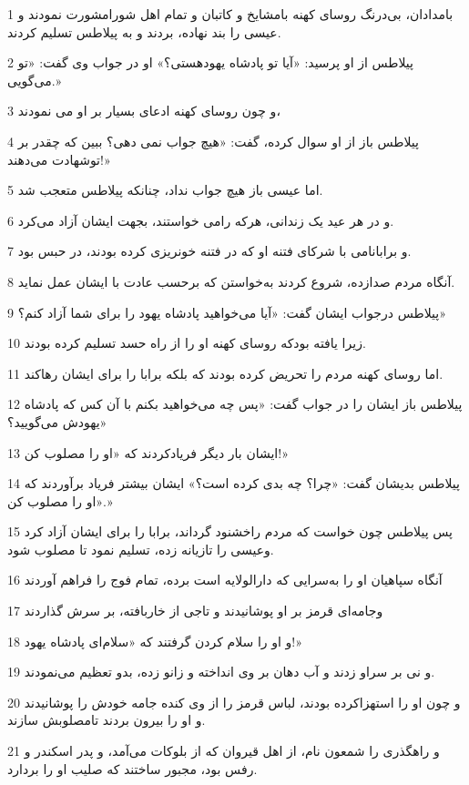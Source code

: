 \par 1 بامدادان، بی‌درنگ روسای کهنه بامشایخ و کاتبان و تمام اهل شورامشورت نمودند و عیسی را بند نهاده، بردند و به پیلاطس تسلیم کردند.
\par 2 پیلاطس از او پرسید: «آیا تو پادشاه یهودهستی؟» او در جواب وی گفت: «تو می‌گویی.»
\par 3 و چون روسای کهنه ادعای بسیار بر او می نمودند،
\par 4 پیلاطس باز از او سوال کرده، گفت: «هیچ جواب نمی دهی؟ ببین که چقدر بر توشهادت می‌دهند!»
\par 5 اما عیسی باز هیچ جواب نداد، چنانکه پیلاطس متعجب شد.
\par 6 و در هر عید یک زندانی، هر‌که رامی خواستند، بجهت ایشان آزاد می‌کرد.
\par 7 و برابانامی با شرکای فتنه او که در فتنه خونریزی کرده بودند، در حبس بود.
\par 8 آنگاه مردم صدازده، شروع کردند به‌خواستن که برحسب عادت با ایشان عمل نماید.
\par 9 پیلاطس درجواب ایشان گفت: «آیا می‌خواهید پادشاه یهود را برای شما آزاد کنم؟»
\par 10 زیرا یافته بودکه روسای کهنه او را از راه حسد تسلیم کرده بودند.
\par 11 اما روسای کهنه مردم را تحریض کرده بودند که بلکه برابا را برای ایشان رهاکند.
\par 12 پیلاطس باز ایشان را در جواب گفت: «پس چه می‌خواهید بکنم با آن کس که پادشاه یهودش می‌گویید؟»
\par 13 ایشان بار دیگر فریادکردند که «او را مصلوب کن!»
\par 14 پیلاطس بدیشان گفت: «چرا؟ چه بدی کرده است؟» ایشان بیشتر فریاد برآوردند که «او را مصلوب کن.»
\par 15 پس پیلاطس چون خواست که مردم راخشنود گرداند، برابا را برای ایشان آزاد کرد وعیسی را تازیانه زده، تسلیم نمود تا مصلوب شود.
\par 16 آنگاه سپاهیان او را به‌سرایی که دارالولایه است برده، تمام فوج را فراهم آوردند
\par 17 وجامه‌ای قرمز بر او پوشانیدند و تاجی از خاربافته، بر سرش گذاردند
\par 18 و او را سلام کردن گرفتند که «سلام‌ای پادشاه یهود!»
\par 19 و نی بر سراو زدند و آب دهان بر وی انداخته و زانو زده، بدو تعظیم می‌نمودند.
\par 20 و چون او را استهزاکرده بودند، لباس قرمز را از وی کنده جامه خودش را پوشانیدند و او را بیرون بردند تامصلوبش سازند.
\par 21 و راهگذری را شمعون نام، از اهل قیروان که از بلوکات می‌آمد، و پدر اسکندر و رفس بود، مجبور ساختند که صلیب او را بردارد.
